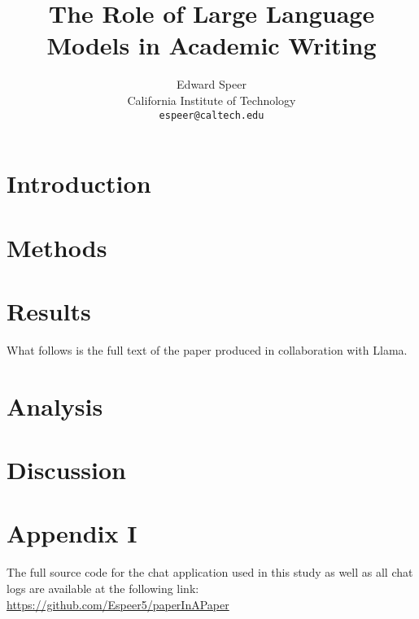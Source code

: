 \documentclass[11pt, a4paper, hyphens]{article}
\title{The Role of Large Language Models in Academic Writing}
\author{%
  Edward Speer
  \\
  California Institute of Technology\\
  \texttt{espeer@caltech.edu} \\
}
\date{\monthyeardate}
\begin{document}
\maketitle

\section{Introduction}\label{sec:introduction}



\section{Methods}\label{sec:methods}



\section{Results}\label{sec:results}

What follows is the full text of the paper produced in collaboration with Llama.



\section{Analysis}\label{sec:analysis}



\section{Discussion}\label{sec:conclusion}



\section{Appendix I}\label{sec:appendixI}

The full source code for the chat application used in this study as well as all
chat logs are available at the following link: 
\url{https://github.com/Espeer5/paperInAPaper}

% 
\end{document}
